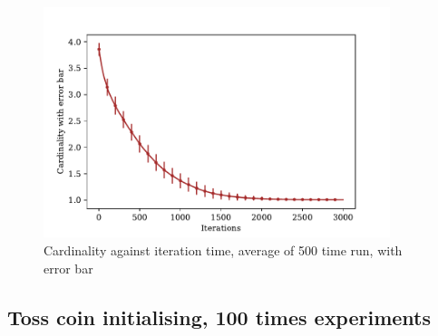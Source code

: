 \documentclass[a4paper,12pt]{article}
\begin{document}
	\begin{figure}[H]
		\centering
		\includegraphics[width=0.9\textwidth]{card_errbarnorm1_200_3000_500}
		\caption{Cardinality against iteration time, average of 500 time run, with error bar}\label{card_errbarnorm1_200_3000_500}
	\end{figure}
\subsection{Toss coin initialising,	100 times experiments}\label{tcsqrank}
\end{document}
